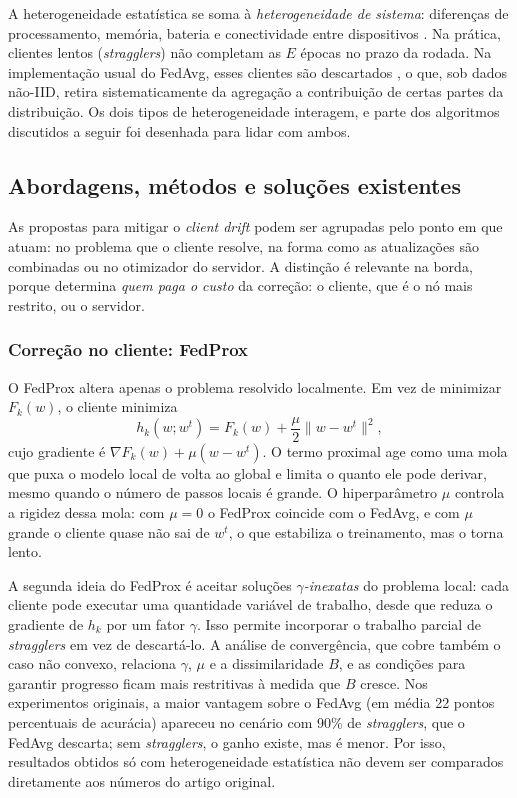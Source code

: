 A heterogeneidade estatística se soma à \emph{heterogeneidade de sistema}: diferenças de processamento, memória, bateria e conectividade entre dispositivos \citep{li2020challenges, lim2020mobileedge}. Na prática, clientes lentos (\textit{stragglers}) não completam as $E$ épocas no prazo da rodada. Na implementação usual do FedAvg, esses clientes são descartados \citep{li2020fedprox}, o que, sob dados não-IID, retira sistematicamente da agregação a contribuição de certas partes da distribuição. Os dois tipos de heterogeneidade interagem, e parte dos algoritmos discutidos a seguir foi desenhada para lidar com ambos.

\subsection{Abordagens, métodos e soluções existentes}
\label{ref:abordagens}

As propostas para mitigar o \textit{client drift} podem ser agrupadas pelo ponto em que atuam: no problema que o cliente resolve, na forma como as atualizações são combinadas ou no otimizador do servidor. A distinção é relevante na borda, porque determina \emph{quem paga o custo} da correção: o cliente, que é o nó mais restrito, ou o servidor.

\subsubsection{Correção no cliente: FedProx}

O FedProx \citep{li2020fedprox} altera apenas o problema resolvido localmente. Em vez de minimizar $F_k(w)$, o cliente minimiza
\begin{equation}
    h_k(w; w^t) = F_k(w) + \frac{\mu}{2}\lVert w - w^t \rVert^2 ,
    \label{eq:fedprox}
\end{equation}
cujo gradiente é $\nabla F_k(w) + \mu (w - w^t)$. O termo proximal age como uma mola que puxa o modelo local de volta ao global e limita o quanto ele pode derivar, mesmo quando o número de passos locais é grande. O hiperparâmetro $\mu$ controla a rigidez dessa mola: com $\mu = 0$ o FedProx coincide com o FedAvg, e com $\mu$ grande o cliente quase não sai de $w^t$, o que estabiliza o treinamento, mas o torna lento.

A segunda ideia do FedProx é aceitar soluções \emph{$\gamma$-inexatas} do problema local: cada cliente pode executar uma quantidade variável de trabalho, desde que reduza o gradiente de $h_k$ por um fator $\gamma$. Isso permite incorporar o trabalho parcial de \textit{stragglers} em vez de descartá-lo. A análise de convergência, que cobre também o caso não convexo, relaciona $\gamma$, $\mu$ e a dissimilaridade $B$, e as condições para garantir progresso ficam mais restritivas à medida que $B$ cresce. Nos experimentos originais, a maior vantagem sobre o FedAvg (em média 22 pontos percentuais de acurácia) apareceu no cenário com 90\% de \textit{stragglers}, que o FedAvg descarta; sem \textit{stragglers}, o ganho existe, mas é menor. Por isso, resultados obtidos só com heterogeneidade estatística não devem ser comparados diretamente aos números do artigo original.

